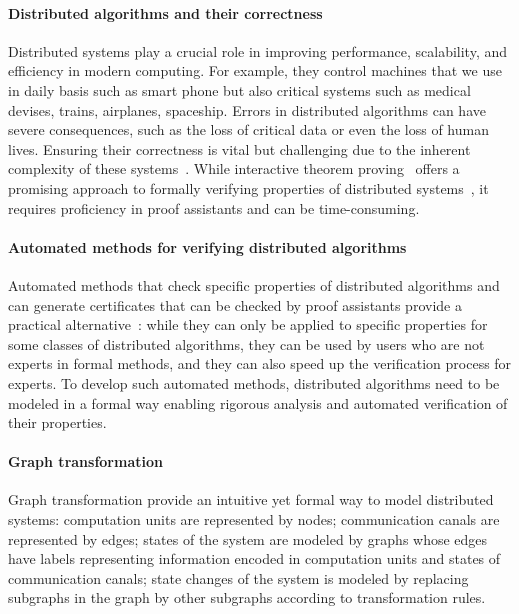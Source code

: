 \paragraph{Distributed algorithms and their correctness}
Distributed systems play a crucial role in improving performance, 
scalability, and efficiency in modern computing.
For example, they control machines that we use in daily basis such as smart phone but also critical systems such as medical devises, trains, airplanes, spaceship. Errors in distributed algorithms can have severe consequences, such as the loss of critical data or even the loss of human lives. Ensuring their correctness is vital but challenging due to the inherent complexity of these systems~\cite{heiser2010theroad, lamport2019thebyzantine}. While interactive theorem proving~\cite{harrison2014history} offers a promising approach to formally verifying properties of distributed systems~\cite{plump2024formalisingDPO,potop2019formal,courtieu2016certified},  
it requires proficiency in proof assistants and can be
time-consuming.

\paragraph{Automated methods for verifying distributed algorithms}
 Automated methods that check specific properties of distributed algorithms and can generate certificates that can be checked by proof assistants provide a practical alternative~\cite{contejean2011automated,giesl2014proving}: while they can only be applied to specific properties for some classes of distributed algorithms, they can be used by users who are not experts in formal methods, and they can also speed up the verification process for experts. To develop such automated methods, distributed algorithms need to be modeled in a formal way enabling rigorous analysis and automated verification of their properties.


 \paragraph{Graph transformation}
 Graph transformation provide an intuitive yet formal way to model distributed systems: computation units are represented by nodes; communication canals are represented by edges; states of the system are modeled by graphs whose edges have labels representing information encoded in computation units and states of communication canals; state changes of the system is modeled by replacing subgraphs in the graph by other subgraphs according to transformation rules.


